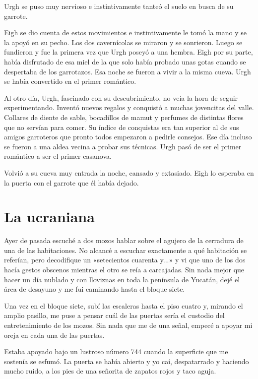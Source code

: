 \documentclass[12pt,twoside,openright,a6paper]{book}
\begin{document}
Urgh se puso muy nervioso e instintivamente tanteó el suelo en busca de
su garrote.

Eigh se dio cuenta de estos movimientos e instintivamente le tomó la
mano y se la apoyó en su pecho. Los dos cavernícolas se miraron y se
sonrieron. Luego se fundieron y fue la primera vez que Urgh poseyó a una
hembra. Eigh por su parte, había disfrutado de esa miel de la que solo había
probado unas gotas cuando se despertaba de los garrotazos. Esa noche se fueron
a vivir a la misma cueva. Urgh se había convertido en el primer romántico.

Al otro día, Urgh, fascinado con su descubrimiento, no veía la hora
de seguir experimentando. Inventó nuevos regalos y conquistó a muchas
jovencitas del valle. Collares de diente de sable, bocadillos de mamut
y perfumes de distintas flores que no servían para comer. Su índice de
conquistas era tan superior al de sus amigos garroteros que pronto todos
empezaron a pedirle consejos. Ese día incluso se fueron a una aldea vecina
a probar sus técnicas. Urgh pasó de ser el primer romántico a ser el
primer casanova.

Volvió a su cueva muy entrada la noche, cansado y extasiado. Eigh lo
esperaba en la puerta con el garrote que él había dejado.

\chapter*{La ucraniana} 


Ayer de pasada escuché a dos mozos hablar sobre el agujero de la cerradura de
una de las habitaciones. No alcancé a escuchar exactamente a qué habitación
se referían, pero decodifique un «setecientos cuarenta y...» y vi que uno
de los dos hacía gestos obscenos mientras el otro se reía a carcajadas. Sin
nada mejor que hacer un día nublado y con lloviznas en toda la península de
Yucatán, dejé el área de desayuno y me fui caminando hasta el bloque siete.

 Una vez en el bloque siete, subí las escaleras
hasta el piso cuatro y, mirando el amplio pasillo, me puse a pensar cuál
de las puertas sería el custodio del entretenimiento de los mozos. Sin nada
que me de una señal, empecé a apoyar mi oreja en cada una de las puertas.

Estaba apoyado bajo un lustroso número 744 cuando la superficie que me
sostenía se esfumó. La puerta se había abierto y yo caí, despatarrado
y haciendo mucho ruido, a los pies de una señorita de zapatos rojos y
taco aguja.
\end{document}
